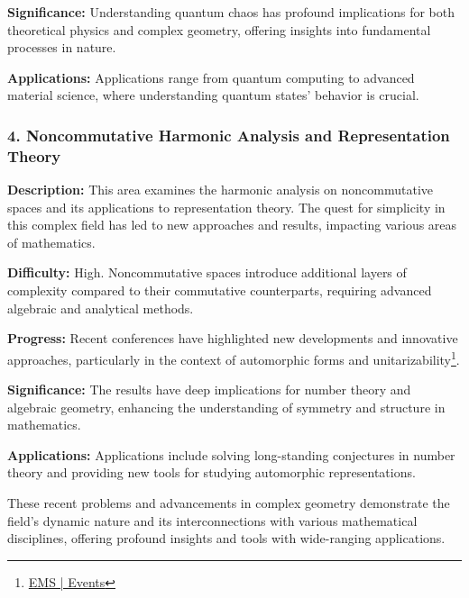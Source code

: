 \documentclass[lang=en,12pt]{beautybook}
\begin{document}
\textbf{Significance:} 
Understanding quantum chaos has profound implications for both theoretical physics and complex geometry, offering insights into fundamental processes in nature.

\textbf{Applications:} 
Applications range from quantum computing to advanced material science, where understanding quantum states' behavior is crucial.

\subsubsection*{4. Noncommutative Harmonic Analysis and Representation Theory}

\textbf{Description:} 
This area examines the harmonic analysis on noncommutative spaces and its applications to representation theory. The quest for simplicity in this complex field has led to new approaches and results, impacting various areas of mathematics.

\textbf{Difficulty:} 
High. Noncommutative spaces introduce additional layers of complexity compared to their commutative counterparts, requiring advanced algebraic and analytical methods.

\textbf{Progress:} 
Recent conferences have highlighted new developments and innovative approaches, particularly in the context of automorphic forms and unitarizability\footnote{\href{https://euromathsoc.org/events}{EMS | Events}}.

\textbf{Significance:} 
The results have deep implications for number theory and algebraic geometry, enhancing the understanding of symmetry and structure in mathematics.

\textbf{Applications:} 
Applications include solving long-standing conjectures in number theory and providing new tools for studying automorphic representations.

These recent problems and advancements in complex geometry demonstrate the field's dynamic nature and its interconnections with various mathematical disciplines, offering profound insights and tools with wide-ranging applications.
\end{document}
